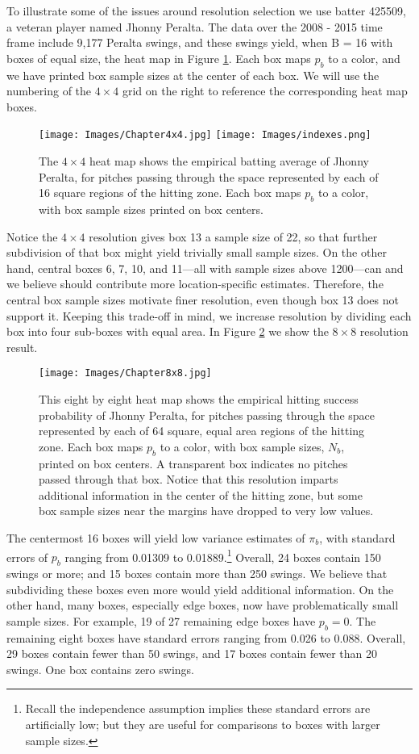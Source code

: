 To illustrate some of the issues around resolution selection we use batter 425509, a veteran player named Jhonny Peralta. The data over the 2008 - 2015 time frame include 9,177 Peralta swings, and these swings yield, when B = 16 with boxes of equal size, the heat map in Figure \ref{fig:4x4}.
Each box maps $p_{b}$ to a color, and we have printed box sample sizes at the center of each box. We will use the numbering of the $4 \times 4$ grid on the right to reference the corresponding heat map boxes. 
        \begin{figure}[H]
      	\centering
      	\texttt{[image: Images/Chapter4x4.jpg]} 
      	\texttt{[image: Images/indexes.png]}
      	\caption{The $4 \times 4$ heat map shows the empirical batting average of Jhonny Peralta, for pitches passing through the space represented by each of 16 square regions of the hitting zone. Each box maps $p_{b}$ to a color, with box sample sizes printed on box centers.}
      	\label{fig:4x4}
      	\end{figure} 
Notice the $4 \times 4$ resolution gives box 13 a sample size of 22, so that further subdivision of that box might yield trivially small sample sizes. On the other hand, central boxes 6, 7, 10, and 11---all with sample sizes above 1200---can and we believe should contribute more location-specific estimates. Therefore, the central box sample sizes motivate finer resolution, even though box 13 does not support it. Keeping this trade-off in mind, we increase resolution by dividing each box into four sub-boxes with equal area. In Figure \ref{fig:8x8} we show the $8 \times 8$ resolution result.
        \begin{figure}[H]
      	\centering
      	\texttt{[image: Images/Chapter8x8.jpg]} 
      	\caption{This eight by eight heat map shows the empirical hitting success probability of Jhonny Peralta, for pitches passing through the space represented by each of 64 square, equal area regions of the hitting zone. Each box maps $p_{b}$ to a color, with box sample sizes, $N_{b}$, printed on box centers. A transparent box indicates no pitches passed through that box. Notice that this resolution imparts additional information in the center of the hitting zone, but some box sample sizes near the margins have dropped to very low values.}
      	\label{fig:8x8}
      	\end{figure} 
The centermost 16 boxes will yield low variance estimates of $\pi_{b}$, with standard errors of $p_{b}$ ranging from 0.01309 to 0.01889.\footnote{Recall the independence assumption implies these standard errors are artificially low; but they are useful for comparisons to boxes with larger sample sizes.}  Overall, 24 boxes contain 150 swings or more; and 15 boxes contain more than 250 swings. We believe that subdividing these boxes even more would yield additional information. On the other hand, many boxes, especially edge boxes, now have problematically small sample sizes. For example, 19 of 27 remaining edge boxes have $p_{b} = 0$. The remaining eight boxes have standard errors ranging from 0.026 to 0.088. Overall, 29 boxes contain fewer than 50 swings, and 17 boxes contain fewer than 20 swings. One box contains zero swings.

